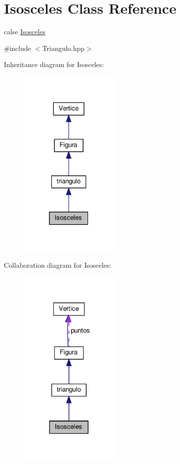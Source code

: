 \hypertarget{class_isosceles}{}\section{Isosceles Class Reference}
\label{class_isosceles}


calse \hyperlink{class_isosceles}{Isosceles}  




{\ttfamily \#include $<$Triangulo.\+hpp$>$}



Inheritance diagram for Isosceles\+:
\nopagebreak
\begin{figure}[H]
\begin{center}
\leavevmode
\includegraphics[width=139pt]{class_isosceles__inherit__graph}
\end{center}
\end{figure}


Collaboration diagram for Isosceles\+:
\nopagebreak
\begin{figure}[H]
\begin{center}
\leavevmode
\includegraphics[width=143pt]{class_isosceles__coll__graph}
\end{center}
\end{figure}
